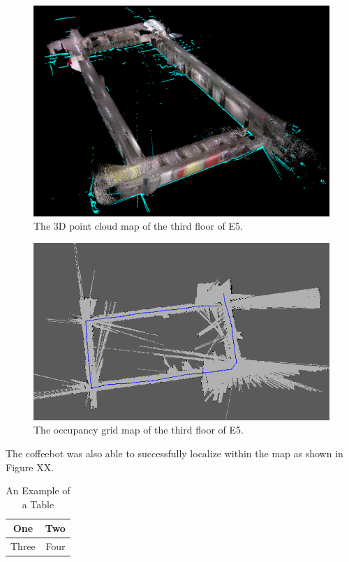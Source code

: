 \documentclass[letterpaper, 10 pt, conference]{ieeeconf}  %
\begin{document}
	\begin{figure}[!ht]
		\centering
		\includegraphics[width=1.0\columnwidth]{Figures/3rdfloor_point_cloud}
		\caption{The 3D point cloud map of the third floor of E5.}
		\label{third_point_cloud}
	\end{figure}
	
	\begin{figure}[!ht]
		\centering
		\includegraphics[width=1.0\columnwidth]{Figures/3rd_occupancy_grid}
		\caption{The occupancy grid map of the third floor of E5.}
		\label{third_occ_grid}
	\end{figure}

The coffeebot was also able to successfully localize within the map as shown in Figure XX.

\begin{table}[h]
\caption{An Example of a Table}
\label{table_example}
\begin{center}
\begin{tabular}{|c||c|}
\hline
One & Two\\
\hline
Three & Four\\
\hline
\end{tabular}
\end{center}
\end{table}
\end{document}
